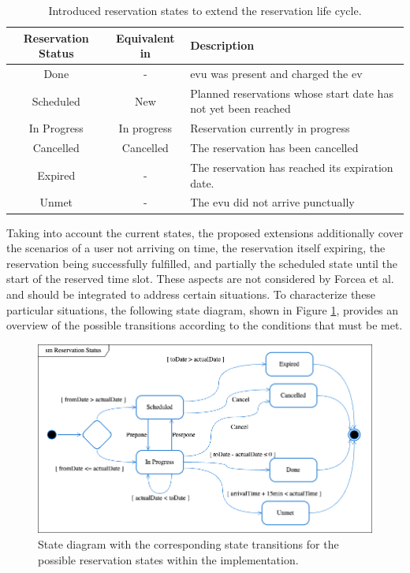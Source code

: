 \begingroup
\setlength{\tabcolsep}{10pt} %
\renewcommand{\arraystretch}{1.5} %
\begin{table}[h]
    \centering
    \caption{Introduced reservation states to extend the reservation life cycle.}
    \begin{tabular}{c|c|m{7cm}}
        Reservation Status & Equivalent in \cite{flocea_electric_2022} & Description \\ \hline
        Done & - & \acrshort{evu} was present and charged the \acrshort{ev} \\
        Scheduled & New & Planned reservations whose start date has not yet been reached \\
        In Progress & In progress & Reservation currently in progress \\
        Cancelled & Cancelled & The reservation has been cancelled \\
        Expired & - & The reservation has reached its expiration date. \\
        Unmet & - & The \acrshort{evu} did not arrive punctually
    \end{tabular}
    \label{tab:reservation-states}
\end{table}
\endgroup

\noindent Taking into account the current states, the proposed extensions additionally cover the scenarios of a user not arriving on time, the reservation itself expiring, the reservation being successfully fulfilled, and partially the scheduled state until the start of the reserved time slot. 
These aspects are not considered by Forcea et al. and should be integrated to address certain situations.
To characterize these particular situations, the following state diagram, shown in Figure \ref{fig:reservation-states}, provides an overview of the possible transitions according to the conditions that must be met.

\begin{figure}[h]
    \centering
    \includegraphics[scale=0.4]{resources/images/main/5_design/ReservationStatusStates.png}
    \caption{State diagram with the corresponding state transitions for the possible reservation states within the implementation.}
    \label{fig:reservation-states}
\end{figure}

